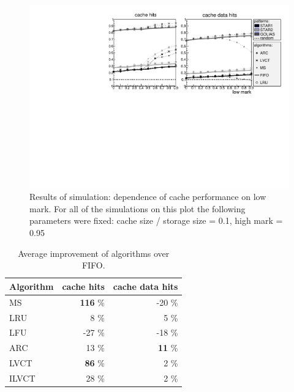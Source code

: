 \documentclass[english]{ddny}
\begin{document}
        \begin{figure}
                \centering
                \includegraphics[width=\textwidth, natwidth=610,natheight=642]{pic/low-basic.pdf}
                \caption{Results of simulation: dependence of cache performance on low mark. For all of the simulations on this plot the following parameters were fixed: cache size / storage size = 0.1, high mark = 0.95}
                \label{plots:low}
        \end{figure}


\begin{table}
\caption{Average improvement of algorithms over FIFO.}
\centering
\begin{tabular}{lrr}
\hline
Algorithm & cache hits & cache data hits\\ \hline
MS & \textbf{116} \% & -20 \% \\ 
LRU & 8 \% & 5 \% \\ 
LFU & -27 \% & -18 \% \\ 
ARC & 13 \% & \textbf{11} \%\\ 
LVCT & \textbf{86} \%& 2 \%\\ 
ILVCT & \ 28 \%& 2 \%\\ 
\hline
\end{tabular}	

\label{results}
\end{table}
\end{document}
